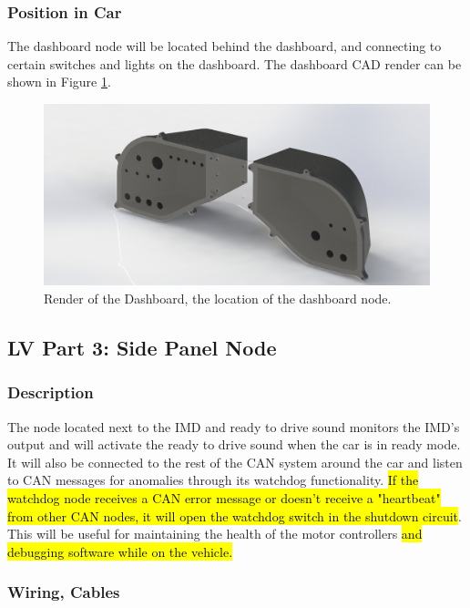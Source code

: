 \documentclass{article}
\DeclareRobustCommand{\hlr}[1]{{\sethlcolor{red}\hl{#1}}}
\begin{document}
        \subsubsection{Position in Car}

            The dashboard node will be located behind the dashboard, and connecting to certain switches and lights on the dashboard. The dashboard CAD render can be shown in Figure \ref{dashboard}.

            \begin{figure}[H]
            \centering
            \includegraphics[width = 0.7 \textwidth]{Dashboard}
            \caption{Render of the Dashboard, the location of the dashboard node. }
            \label{dashboard}
            \end{figure}

    \subsection{LV Part 3: Side Panel Node} \label{imdnode}

        \subsubsection{Description}

            The node located next to the IMD and ready to drive sound monitors the IMD's output and will activate the ready to drive sound when the car is in ready mode. It will also be connected to the rest of the CAN system around the car and listen to CAN messages for anomalies through its watchdog functionality. \hlr{If the watchdog node receives a CAN error message or doesn't receive a "heartbeat" from other CAN nodes, it will open the watchdog switch in the shutdown circuit}. This will be useful for maintaining the health of the motor controllers \hlr{and debugging software while on the vehicle. }

        \subsubsection{Wiring, Cables}
\end{document}
